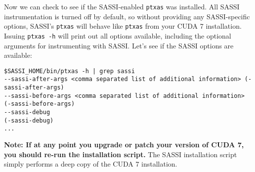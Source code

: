 Now we can check to see if the SASSI-enabled \texttt{ptxas} was
installed.  All SASSI instrumentation is turned off by default, so
without providing any SASSI-specific options, SASSI's \texttt{ptxas}
will behave like \texttt{ptxas} from your CUDA 7 installation.
Issuing \texttt{ptxas -h} will print out all options available,
including the optional arguments for instrumenting with SASSI.  Let's
see if the SASSI options are available:
\begin{lstlisting}[style=BashInputStyle]
$SASSI_HOME/bin/ptxas -h | grep sassi
--sassi-after-args <comma separated list of additional information> (-sassi-after-args)
--sassi-before-args <comma separated list of additional information> (-sassi-before-args)
--sassi-debug                                                        (-sassi-debug)
...
\end{lstlisting}

{\bf{Note:} If at any point you upgrade or patch your version of CUDA 7, you
  should re-run the installation script.}  The SASSI installation
script simply performs a deep copy of the CUDA 7 installation.

